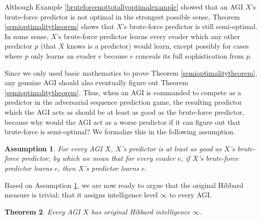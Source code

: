 \documentclass{article}
\newtheorem{theorem}{Theorem}
\newtheorem{assumption}[theorem]{Assumption}
\begin{document}
Although Example \ref{bruteforcenottotallyoptimalexample} showed that
an AGI $X$'s brute-force predictor
is not optimal in the strongest possible sense, Theorem \ref{semioptimalitytheorem}
shows that $X$'s brute-force predictor is still semi-optimal. In some sense,
$X$'s brute-force predictor learns every evader which any other predictor $p$ (that $X$
knows is a predictor) would learn, except possibly for cases where $p$ only learns
an evader $e$ because $e$ conceals its full sophistication from $p$.

Since we only used basic mathematics to prove Theorem \ref{semioptimalitytheorem},
any genuine AGI should also eventually figure out Theorem \ref{semioptimalitytheorem}.
Thus, when an AGI is commanded to compete as a predictor in the adversarial
sequence prediction game, the resulting predictor which the AGI acts as should be
at least as good as the brute-force predictor, because why would the AGI act as
a worse predictor if it can figure out that brute-force is semi-optimal?
We formalize this in the following assumption.

\begin{assumption}
\label{bruteforceassumption}
    For every AGI $X$, $X$'s predictor is at least as good as
    $X$'s brute-force predictor, by which we mean that for every evader $e$,
    if $X$'s brute-force predictor learns $e$, then $X$'s predictor
    learns $e$.
\end{assumption}

Based on Assumption \ref{bruteforceassumption},
we are now ready to argue that the original Hibbard measure is
trivial: that it assigns intelligence level $\infty$ to every AGI.

\begin{theorem}
\label{everyagihasoriginalhibbardintinfinitytheorem}
    Every AGI $X$ has original Hibbard intelligence $\infty$.
\end{theorem}
\end{document}
